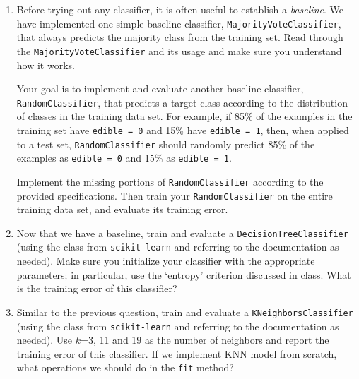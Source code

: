 \begin{enumerate}

\item {} Before trying out any classifier, it is often useful to establish a \emph{baseline}. We have implemented one simple baseline classifier, \verb|MajorityVoteClassifier|, that always predicts the majority class from the training set. Read through the \verb|MajorityVoteClassifier| and its usage and make sure you understand how it works.

Your goal is to implement and evaluate another baseline classifier, \verb|RandomClassifier|, that predicts a target class according to the distribution of classes in the training data set. For example, if 85\% of the examples in the training set have \verb|edible = 0| and 15\% have \verb|edible = 1|, then, when applied to a test set, \verb|RandomClassifier| should randomly predict 85\% of the examples as \verb|edible = 0| and 15\% as \verb|edible = 1|.

Implement the missing portions of \verb|RandomClassifier| according to the provided specifications. Then train your \verb|RandomClassifier| on the entire training data set, and evaluate its training error. 



\item {} Now that we have a baseline, train and evaluate a \verb|DecisionTreeClassifier| (using the class from \verb|scikit-learn| and referring to the documentation as needed). Make sure you initialize your classifier with the appropriate parameters; in particular, use the `entropy' criterion discussed in class. What is the training error of this classifier?


\item {} Similar to the previous question, train and evaluate a \verb|KNeighborsClassifier| (using the class from \verb|scikit-learn| and referring to the documentation as needed). Use $k$=3, 11 and 19 as the number of neighbors and report the training error of this classifier. If we implement KNN model from scratch, what operations we should do in the \verb|fit| method?



\end{enumerate}
